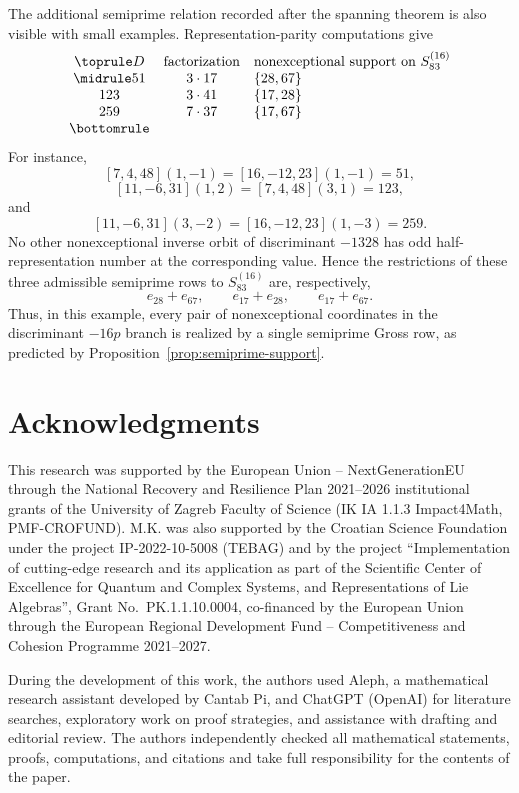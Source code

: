 \documentclass[11pt]{amsart}
\theoremstyle{definition}
\theoremstyle{remark}
\begin{document}
The additional semiprime relation recorded after the spanning theorem is
also visible with small examples. Representation-parity computations give
\[
\begin{array}{ccl}
\toprule
D & \text{factorization} &
\text{nonexceptional support on }S_{83}^{(16)}\\
\midrule
51  & 3\cdot17 & \{28,67\}\\
123 & 3\cdot41 & \{17,28\}\\
259 & 7\cdot37 & \{17,67\}\\
\bottomrule
\end{array}
\]
For instance,
\[
  [7,4,48](1,-1)=[16,-12,23](1,-1)=51,
\]
\[
  [11,-6,31](1,2)=[7,4,48](3,1)=123,
\]
and
\[
  [11,-6,31](3,-2)=[16,-12,23](1,-3)=259.
\]
No other nonexceptional inverse orbit of discriminant $-1328$ has
odd half-representation number at the corresponding value. Hence the
restrictions of these three admissible semiprime rows to $S_{83}^{(16)}$
are, respectively,
\[
  e_{28}+e_{67},\qquad
  e_{17}+e_{28},\qquad
  e_{17}+e_{67}.
\]
Thus, in this example, every pair of nonexceptional coordinates in the
discriminant $-16p$ branch is realized by a single semiprime Gross row, as
predicted by Proposition~\ref{prop:semiprime-support}.

\section*{Acknowledgments}

This research was supported by the European Union -- NextGenerationEU through the National Recovery and Resilience Plan 2021--2026 institutional grants of the University of Zagreb Faculty of Science (IK IA 1.1.3 Impact4Math, PMF-CROFUND). M.K. was also supported by the Croatian Science Foundation under the project IP-2022-10-5008 (TEBAG) and by the project ``Implementation of cutting-edge research and its application as part of the Scientific Center of Excellence for Quantum and Complex Systems, and Representations of Lie Algebras'', Grant No.~PK.1.1.10.0004, co-financed by the European Union through the European Regional Development Fund -- Competitiveness and Cohesion Programme 2021--2027.

During the development of this work, the authors used Aleph, a mathematical research assistant developed by Cantab Pi, and ChatGPT (OpenAI) for literature searches, exploratory work on proof strategies, and assistance with drafting and editorial review. The authors independently checked all mathematical statements, proofs, computations, and citations and take full responsibility for the contents of the paper.
\end{document}
